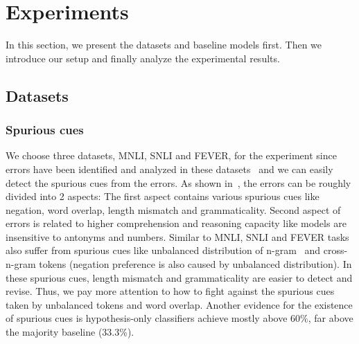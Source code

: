 \section{Experiments}
\label{sec:experiments}

In this section, we present the datasets and baseline models first. Then we introduce our setup 
and finally analyze the experimental results.

\subsection{Datasets}
\label{sec:dataset}

\subsubsection{Spurious cues}
\label{sec:patterns}
We choose three datasets, MNLI, SNLI and FEVER, for the experiment since 
errors have been identified and analyzed in these datasets~\cite{naik2018stress,mccoy2019right,schuster2019towards,nie2019adversarial} and 
we can easily detect the spurious cues from the errors. 
As shown in~, the errors can be roughly divided into 2 aspects: 
The first aspect contains various spurious cues like negation, word overlap, length mismatch and 
grammaticality. Second aspect of errors is related to higher comprehension and reasoning capacity like 
models are insensitive to antonyms and numbers. 
Similar to MNLI, %
SNLI and FEVER tasks also suffer 
from spurious cues like unbalanced distribution of n-gram~\cite{bowman2015large} and
cross-n-gram tokens (negation preference is also caused by unbalanced distribution). 
In these spurious cues, length mismatch and 
grammaticality are easier to detect and revise. Thus, we pay more attention to 
how to fight against the spurious cues taken by unbalanced tokens and word overlap. 
Another evidence for the existence of spurious cues is hypothesis-only classifiers
achieve mostly above 60\%, far above the majority
baseline (33.3\%).



